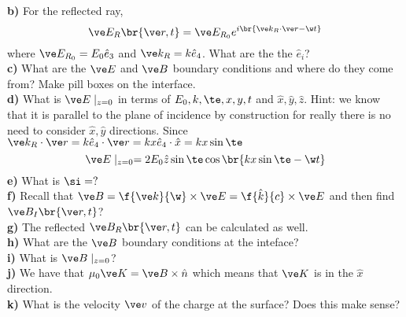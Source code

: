 \documentclass{article}
\begin{document}
\begin{center}
\end{center}

\textbf{b)} For the reflected ray,
\[ \ve E_R \br{\ve r, t} = \ve E_{R_0} e^{i \br{\ve k_R \cdot \ve r - \w t}} \]
where $\ve E_{R_0} = E_0 \hat e_3$ and $\ve k_R = k \hat e_4$. What are the the $\hat e_i$?\\
\textbf{c)} What are the $\ve E$ and $\ve B$ boundary conditions and where do they come from? Make pill boxes on the interface. \\
\textbf{d)} What is $\ve E \mid_{z = 0}$ in terms of $E_0, k, \te, x, y, t$ and $\hat x, \hat y, \hat z$. Hint: we know that it is parallel to the plane of incidence by construction for really there is no need to consider $\hat x, \hat y$ directions. Since $\ve k_R \cdot \ve r = k \hat e_4 \cdot \ve r = kx \hat e_4 \cdot \hat x = kx \sin \te$
\[ \ve E \mid_{z= 0} = 2 E_0 \hat z \sin \te \cos \br{kx\sin\te - \w t} \]
\textbf{e)} What is $\si = ?$ \\
\textbf{f)} Recall that $\ve B = \f{\ve k}{\w} \times \ve E = \f{\hat k}{c} \times \ve E$ and then find $\ve B_I \br{\ve r, t}$? \\
\textbf{g)} The reflected $\ve B_R\br{\ve r, t}$ can be calculated as well. \\
\textbf{h)} What are the $\ve B$ boundary conditions at the inteface? \\
\textbf{i)} What is $\ve B \mid_{z = 0}$? \\
\textbf{j)} We have that $\mu_0 \ve K = \ve B \times \hat n$ which means that $\ve K$ is in the $\hat x$ direction. \\
\textbf{k)} What is the velocity $\ve v$ of the charge at the surface? Does this make sense?
\end{document}

